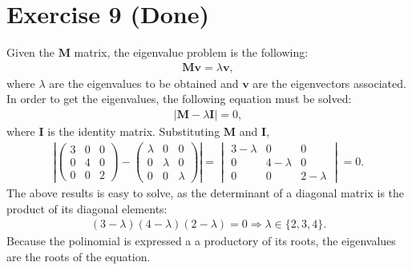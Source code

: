 \documentclass[letterpaper,11pt,twoside]{article}
\begin{document}
\section{Exercise 9 (Done)}
Given the $\bm{M}$ matrix, the eigenvalue problem is the following:
\begin{align}
  \bm{M}\bm{v}=\lambda\bm{v},
\end{align}
where $\lambda$ are the eigenvalues to be obtained and $\bm{v}$ are the eigenvectors associated.
In order to get the eigenvalues, the following equation must be solved:
\begin{align}
  |\bm{M}-\lambda\bm{I}|=0,
\end{align}
where $\bm{I}$ is the identity matrix. Substituting $\bm{M}$ and $\bm{I}$,
\begin{align*}
  \left|\begin{pmatrix}
    3&0&0\\0&4&0\\0&0&2
  \end{pmatrix}-\begin{pmatrix}
    \lambda&0&0\\0&\lambda&0\\0&0&\lambda
  \end{pmatrix}\right|=\begin{vmatrix}
    3-\lambda&0&0\\0&4-\lambda&0\\0&0&2-\lambda
  \end{vmatrix}=0.
\end{align*}
The above results is easy to solve, as the determinant of a diagonal matrix is the product of its diagonal elements:
\begin{align}
  (3-\lambda)(4-\lambda)(2-\lambda)=0\Longrightarrow\lambda\in\{2,3,4\}.
\end{align}
Because the polinomial is expressed a a productory of its roots, the eigenvalues are the roots of the equation.
\end{document}

